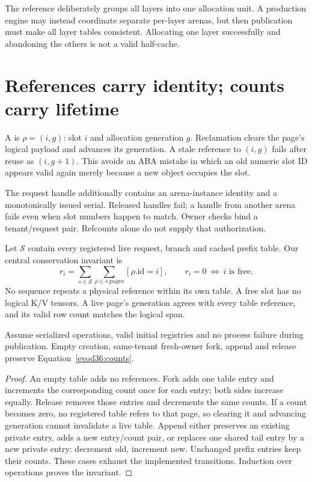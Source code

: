 
The reference deliberately groups all layers into one allocation unit. A
production engine may instead coordinate separate per-layer arenas, but
then publication must make all layer tables consistent. Allocating one
layer successfully and abandoning the others is not a valid half-cache.

\section{References carry identity; counts carry lifetime}
\label{evod36:lifetime}
A  is $\rho=(i,g)$: slot $i$ and allocation
generation $g$. Reclamation clears the page's logical payload and advances
its generation. A stale reference to $(i,g)$ fails after reuse as $(i,g+1)$.
This avoids an ABA mistake in which an old numeric slot ID appears valid
again merely because a new object occupies the slot.

The request handle additionally contains an arena-instance identity and a
monotonically issued serial. Released handles fail; a handle from another
arena fails even when slot numbers happen to match. Owner checks bind a
tenant/request pair. Refcounts alone do not supply that authorization.

Let $\mathcal S$ contain every registered live request, branch and cached
prefix table. Our central conservation invariant is
\begin{equation}
 r_i=\sum_{s\in\mathcal S}\sum_{\rho\in s.\mathrm{pages}}
       [\rho.\mathrm{id}=i],\qquad
 r_i=0\ \Longleftrightarrow\ i\text{ is free}.
 \label{evod36:counts}
\end{equation}
No sequence repeats a physical reference within its own table. A free slot
has no logical K/V tensors. A live page's generation agrees with every
table reference, and its valid row count matches the logical span.

\begin{proposition}
Assume serialized operations, valid initial registries and no process
failure during publication. Empty creation, same-tenant fresh-owner fork,
append and release preserve Equation~\eqref{evod36:counts}.
\end{proposition}
\begin{proof}
An empty table adds no references. Fork adds one table entry and increments
the corresponding count once for each entry; both sides increase equally.
Release removes those entries and decrements the same counts. If a count
becomes zero, no registered table refers to that page, so clearing it and
advancing generation cannot invalidate a live table. Append either preserves
an existing private entry, adds a new entry/count pair, or replaces one
shared tail entry by a new private entry: decrement old, increment new.
Unchanged prefix entries keep their counts. These cases exhaust the
implemented transitions. Induction over operations proves the invariant.
\end{proof}

